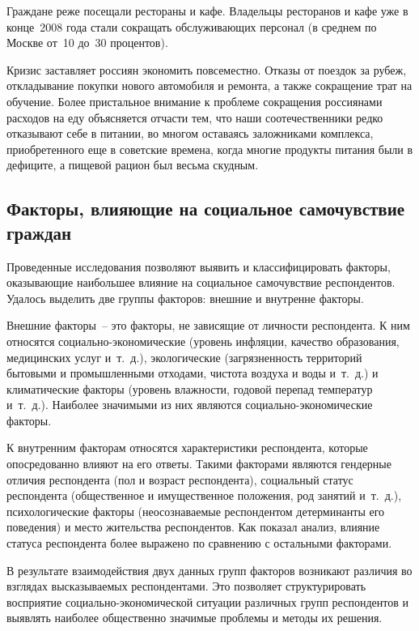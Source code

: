   Граждане реже посещали рестораны и кафе. Владельцы ресторанов и кафе уже в
  конце~2008 года стали сокращать обслуживающих персонал (в среднем по Москве
  от~10 до~30 процентов).

  Кризис заставляет россиян экономить повсеместно. Отказы от поездок за рубеж,
  откладывание покупки нового автомобиля и ремонта, а также сокращение трат на
  обучение. Более пристальное внимание к проблеме сокращения россиянами
  расходов на еду объясняется отчасти тем, что наши соотечественники редко
  отказывают себе в питании, во многом оставаясь заложниками комплекса,
  приобретенного еще в советские времена, когда многие продукты питания были в
  дефиците, а пищевой рацион был весьма скудным.

  \subsection{Факторы, влияющие на социальное самочувствие граждан}

  Проведенные исследования позволяют выявить и классифицировать факторы,
  оказывающие наибольшее влияние на социальное самочувствие респондентов.
  Удалось выделить две группы факторов: внешние и внутренне факторы.

  Внешние факторы~-- это факторы, не зависящие от личности респондента. К ним
  относятся социально-экономические (уровень инфляции, качество образования,
  медицинских услуг и~т.~д.), экологические (загрязненность территорий бытовыми
  и промышленными отходами, чистота воздуха и воды и~т.~д.) и климатические
  факторы (уровень влажности, годовой перепад температур и~т.~д.). Наиболее
  значимыми из них являются социально-экономические факторы.

  К внутренним факторам относятся характеристики респондента, которые
  опосредованно влияют на его ответы. Такими факторами являются гендерные
  отличия респондента (пол и возраст респондента), социальный статус
  респондента (общественное и имущественное положения, род занятий и~т.~д.),
  психологические факторы (неосознаваемые респондентом детерминанты его
  поведения) и место жительства респондентов. Как показал анализ, влияние
  статуса респондента более выражено по сравнению с остальными факторами.

  В результате взаимодействия двух данных групп факторов возникают различия во
  взглядах высказываемых респондентами. Это позволяет структурировать
  восприятие социально-экономической ситуации различных групп респондентов и
  выявлять наиболее общественно значимые проблемы и методы их
  решения.~\cite{avraam}

